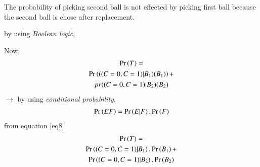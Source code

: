 \documentclass[journal,12pt,twocolumn]{IEEEtran}
\begin{document}
\vspace{0.2in}

The probability of picking second ball is not effected by picking first ball because the second ball is chose after replacement.

\begin{table}
\centering
\caption{Table of variables description}
\end{table}

\begin{table}
\centering
\caption{Table of probability of selecting two different coloured balls from each bag}
by using \textit{Boolean logic},
\end{table}

\vspace{1in}
Now,
\begin{multline}
    \Pr\left(T\right)=\\
    \Pr\left(((C=0,C=1)|B_1)(B_1)\right)+\\
    pr{((C=0,C=1)|B_2)(B_2)}
\end{multline}
$\rightarrow$ by using \textit{conditional probability}, 
\begin{align}\label{eq8}
    \Pr\left(E F\right)=\Pr\left(E|F\right).\Pr\left(F\right)
\end{align}
from equation \eqref{eq8}
\begin{multline}
    \Pr\left(T\right)=\\
    \Pr\left((C=0,C=1)|B_1\right).\Pr\left(B_1\right)+\\
    \Pr\left((C=0,C=1)|B_2\right).\Pr\left(B_2\right)
\end{multline}
\end{document}
